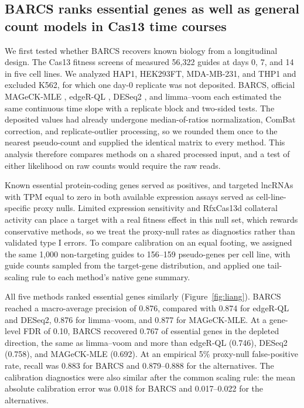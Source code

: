 \subsection{BARCS ranks essential genes as well as general count models in
Cas13 time courses}
\label{sec:liang}

We first tested whether BARCS recovers known biology from a longitudinal
design.  The Cas13 fitness screens of \citet{liang2026lncrna} measured 56,322
guides at days 0, 7, and 14 in five cell lines.  We analyzed HAP1, HEK293FT,
MDA-MB-231, and THP1 and excluded K562, for which one day-0 replicate was not
deposited.  BARCS, official MAGeCK-MLE \citep{li2014mageck}, edgeR-QL
\citep{lun2016edger}, DESeq2 \citep{love2014deseq2}, and limma--voom
\citep{law2014voom} each estimated the same continuous time slope with a
replicate block and two-sided tests.  The deposited values had already
undergone median-of-ratios normalization, ComBat correction, and
replicate-outlier processing, so we rounded them once to the nearest
pseudo-count and supplied the identical matrix to every method.  This analysis
therefore compares methods on a shared processed input, and a test of either
likelihood on raw counts would require the raw reads.

Known essential protein-coding genes served as positives, and targeted lncRNAs
with TPM equal to zero in both available expression assays served as
cell-line-specific proxy nulls.  Limited expression sensitivity and RfxCas13d
collateral activity can place a target with a real fitness effect in this null
set, which rewards conservative methods, so we treat the proxy-null rates as
diagnostics rather than validated type I errors.  To compare calibration on an
equal footing, we assigned the same 1,000 non-targeting guides to 156--159
pseudo-genes per cell line, with guide counts sampled from the target-gene
distribution, and applied one tail-scaling rule to each method's native gene
summary.

All five methods ranked essential genes similarly (Figure~\ref{fig:liang}).
BARCS reached a macro-average precision of 0.876, compared with 0.874 for
edgeR-QL and DESeq2, 0.876 for limma--voom, and 0.877 for MAGeCK-MLE.  At a
gene-level FDR of 0.10, BARCS recovered 0.767 of essential genes in the
depleted direction, the same as limma--voom and more than edgeR-QL (0.746),
DESeq2 (0.758), and MAGeCK-MLE (0.692).  At an empirical 5\% proxy-null
false-positive rate, recall was 0.883 for BARCS and 0.879--0.888 for the
alternatives.  The calibration diagnostics were also similar after the common
scaling rule: the mean absolute calibration error was 0.018 for BARCS and
0.017--0.022 for the alternatives.


